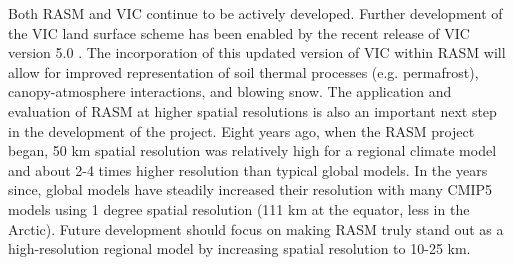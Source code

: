 Both RASM and VIC continue to be actively developed.
Further development of the VIC land surface scheme has been enabled by the recent release of VIC version 5.0 \citep[see also \label{sec:vic_dev}][]{Hamman_2016c,Hamman_2016d}.
The incorporation of this updated version of VIC within RASM will allow for improved representation of soil thermal processes (e.g. permafrost), canopy-atmosphere interactions, and blowing snow.
The application and evaluation of RASM at higher spatial resolutions is also an important next step in the development of the project.
Eight years ago, when the RASM project began, 50 km spatial resolution was relatively high for a regional climate model and about 2-4 times higher resolution than typical global models.
In the years since, global models have steadily increased their resolution with many CMIP5 models using 1 degree spatial resolution (111 km at the equator, less in the Arctic).
Future development should focus on making RASM truly stand out as a high-resolution regional model by increasing spatial resolution to 10-25 km.
